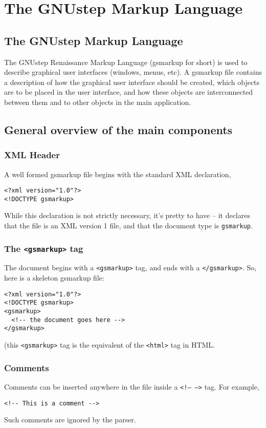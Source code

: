 \chapter{The GNUstep Markup Language}
\section{The GNUstep Markup Language}

The GNUstep Renaissance Markup Language (gsmarkup for short) is used to
describe graphical user interfaces (windows, menus, etc).  A gsmarkup
file contains a description of how the graphical user interface should
be created, which objects are to be placed in the user interface, and
how these objects are interconnected between them and to other objects
in the main application.

\section{General overview of the main components}

\subsection{XML Header}
A well formed gsmarkup file begins with the standard XML declaration,
\begin{verbatim}
<?xml version="1.0"?>
<!DOCTYPE gsmarkup>
\end{verbatim}
While this declaration is not strictly necessary, it's pretty to have
-- it declares that the file is an XML version 1 file, and that the
document type is \texttt{gsmarkup}.

\subsection{The \texttt{<gsmarkup>} tag}
The document begins with a \texttt{<gsmarkup>} tag, and ends with a 
\texttt{</gsmarkup>}.  So, here is a skeleton gsmarkup file:
\begin{verbatim}
<?xml version="1.0"?>
<!DOCTYPE gsmarkup>
<gsmarkup>
  <!-- the document goes here -->
</gsmarkup>
\end{verbatim}
(this \texttt{<gsmarkup>} tag is the equivalent of the \texttt{<html>}
tag in HTML.

\subsection{Comments}
Comments can be inserted anywhere in the file inside a \texttt{<!--
-->} tag.  For example,
\begin{verbatim}
<!-- This is a comment -->
\end{verbatim}
Such comments are ignored by the parser.

